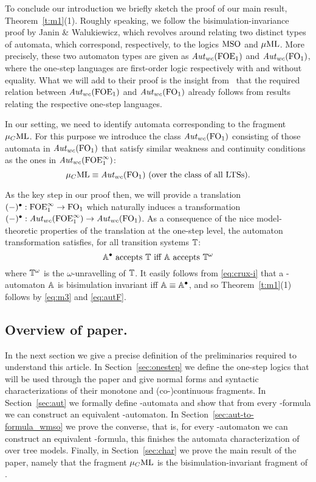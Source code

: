 To conclude our introduction we briefly sketch the proof of our main result, 
Theorem~\ref{t:m1}(1).
Roughly speaking, we follow the bisimulation-invariance proof by Janin \& 
Walukiewicz, which revolves around relating two distinct types of automata, 
which correspond, respectively, to the logics $\mathrm{MSO}$ and $\mu\mathrm{ML}$.
More precisely, these two automaton types are given as $\mathit{Aut}_{wc}(\mathrm{FOE}_1)$ and
$\mathit{Aut}_{wc}(\mathrm{FO}_1)$, where the one-step languages are first-order 
logic respectively with and without equality.
What we will add to their proof is the insight from~\cite{Venxx} that the
required relation between $\mathit{Aut}_{wc}(\mathrm{FOE}_1)$ and $\mathit{Aut}_{wc}(\mathrm{FO}_1)$ already follows
from results relating the respective one-step languages.

In our setting, we need to identify automata corresponding to the fragment
$\mu_{C}\mathrm{ML}$.
For this purpose we introduce the class $\mathit{Aut}_{wc}(\mathrm{FO}_1)$ consisting of those
automata in $\mathit{Aut}_{wc}(\mathrm{FO}_1)$ that satisfy similar weakness and continuity 
conditions as the ones in $\mathit{Aut}_{wc}(\mathrm{FOE}^{\infty}_1)$:
\begin{equation}
\label{eq:autF}
\mucML \equiv \AutWC(\ofo) \text{ (over the class of all LTSs)}.
\end{equation}

As the key step in our proof then, we will provide a translation 
$(-)^{\bullet}: \mathrm{FOE}^{\infty}_1 \to \mathrm{FO}_1$ which naturally induces a transformation 
$(-)^{\bullet}: \mathit{Aut}_{wc}(\mathrm{FOE}^{\infty}_1) \to \mathit{Aut}_{wc}(\mathrm{FO}_1)$.
As a consequence of the nice model-theoretic properties of the translation at 
the one-step level, the automaton transformation satisfies, for all 
transition systems $\mathbb{T}$:
\begin{equation}
\label{eq:crux-i}
\bbA^{\bullet} \text{ accepts } \bbT \text{ iff } \bbA \text{ accepts 
} \omegaunrav{\bbT}
\end{equation}
where ${\mathbb{T}}^\omega$ is the $\omega$-unravelling of $\mathbb{T}$.
It easily follows from \eqref{eq:crux-i} that a \wmso-automaton $\mathbb{A}$
is bisimulation invariant iff $\mathbb{A}\equiv \mathbb{A}^{\bullet}$, and so 
Theorem~\ref{t:m1}(1) follows by \eqref{eq:m3} and \eqref{eq:autF}.

\subsection{Overview of paper.}
In the next section we give a precise definition of the preliminaries required to understand this article. In Section~\ref{sec:onestep} we define the one-step logics that will be used through the paper and give normal forms and syntactic characterizations of their monotone and (co-)continuous fragments. In Section~\ref{sec:aut} we formally define \wmso-automata and show that from every \wmso-formula we can construct an equivalent \wmso-automaton. In Section~\ref{sec:aut-to-formula_wmso} we prove the converse, that is, for every \wmso-automaton we can construct an equivalent \wmso-formula, this finishes the automata characterization of \wmso over tree models. Finally, in Section~\ref{sec:char} we prove the main result of the paper, namely that the fragment $\mu_{C}\mathrm{ML}$ is the bisimulation-invariant fragment of \wmso.


